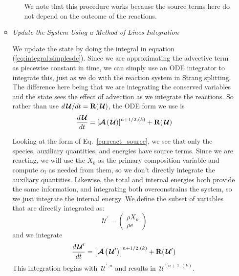 \documentclass[times,modern]{aastex63}
\newcommand{\Ub}{\mathbf{U}}
\newcommand{\odt}[1]{{\frac{{d#1}}{dt}}}
\newcommand{\Uc}{{\,\bm{\mathcal{U}}}}
\newcommand{\ex}{{\bf e}_x}
\newcommand{\Shydro}{{{\bf H}}}
\newcommand{\Rb}{{\bf R}}
\newcommand{\Adv}[1]{{\left [\boldsymbol{\mathcal{A}} \left(#1\right)\right]}}
\begin{document}
\begin{itemize}
\begin{itemize}
\begin{itemize}

    We note that this procedure works because the source terms here do
    not depend on the outcome of the reactions.

    \end{itemize}

  \item {\em Update the System Using a Method of Lines Integration}

    We update the state by doing the integral in equation
    (\ref{eq:integral:simplesdc}).  Since we are approximating the
    advective term as piecewise constant in time, we can simply use an
    ODE integrator to integrate this, just as we do with the reaction
    system in Strang splitting.  The difference here being that we are
    integrating the conserved variables and the state sees the effect
    of advection as we integrate the reactions.  So rather than use
    $d\Uc/dt = \Rb(\Uc)$, the ODE form we use is
    \begin{equation}
      \odt{\Uc} = \Adv{\Uc}^{n+1/2,(k)} + \Rb(\Uc)
    \end{equation}

    Looking at the form of Eq.~\ref{eq:react_source}, we see that only
    the species, auxiliary quantities, and energies have source terms.
    Since we are reacting, we will use the $X_k$ as the primary
    composition variable and compute $\alpha_l$ as needed from them,
    so we don't directly integrate the auxiliary quantities.
    Likewise, the total and internal energies both provide the same
    information, and integrating both overconstrains the system, so we
    just integrate the internal energy.  We define the subset of variables
    that are directly integrated as:
    \begin{equation}
      \Uc^\prime = \left ( \begin{array}{c} \rho X_k \\ \rho e \end{array} \right )
    \end{equation}
    and we integrate
    \begin{equation}
      \odt{\Uc^\prime} = \Adv{\Uc^\prime}^{n+1/2,(k)} + \Rb(\Uc^\prime)
    \end{equation}
    This integration begins with $\Uc^{\prime,n}$ and results in $\Uc^{\prime,n+1,(k)}$.


\end{itemize}
\end{itemize}
\end{document}
